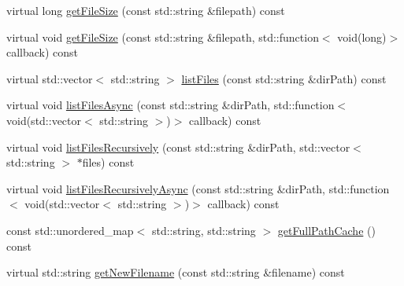 \begin{DoxyCompactItemize}
virtual long \hyperlink{classFileUtils_acba4a8730094e74096bfe4cede7f0315}{get\+File\+Size} (const std\+::string \&filepath) const
\item 
virtual void \hyperlink{classFileUtils_a20603b766e16b04ef5d50f95bc5629a9}{get\+File\+Size} (const std\+::string \&filepath, std\+::function$<$ void(long)$>$ callback) const
\item 
virtual std\+::vector$<$ std\+::string $>$ \hyperlink{classFileUtils_a88fc43b561884e12a9a2d41a9e3b4df4}{list\+Files} (const std\+::string \&dir\+Path) const
\item 
virtual void \hyperlink{classFileUtils_a9156e423bdacb8a2259c145d708ebd9f}{list\+Files\+Async} (const std\+::string \&dir\+Path, std\+::function$<$ void(std\+::vector$<$ std\+::string $>$)$>$ callback) const
\item 
virtual void \hyperlink{classFileUtils_a9507d436baf8e10b6880bb1779649a54}{list\+Files\+Recursively} (const std\+::string \&dir\+Path, std\+::vector$<$ std\+::string $>$ $\ast$files) const
\item 
virtual void \hyperlink{classFileUtils_a840c57c935f02329a8aec254551f3bb7}{list\+Files\+Recursively\+Async} (const std\+::string \&dir\+Path, std\+::function$<$ void(std\+::vector$<$ std\+::string $>$)$>$ callback) const
\item 
const std\+::unordered\+\_\+map$<$ std\+::string, std\+::string $>$ \hyperlink{classFileUtils_af5c339ef609f73c83a94518340871142}{get\+Full\+Path\+Cache} () const
\item 
virtual std\+::string \hyperlink{classFileUtils_a5bf8b3f862e06a2f796c18dfdfe744fc}{get\+New\+Filename} (const std\+::string \&filename) const
\end{DoxyCompactItemize}
